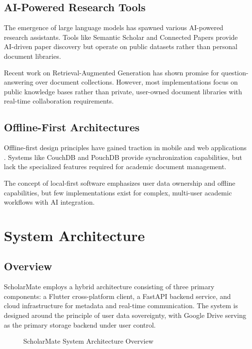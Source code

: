 \documentclass[conference]{IEEEtran}
\begin{document}
\subsection{AI-Powered Research Tools}

The emergence of large language models has spawned various AI-powered research assistants. Tools like Semantic Scholar \cite{semanticscholar} and Connected Papers \cite{connectedpapers} provide AI-driven paper discovery but operate on public datasets rather than personal document libraries.

Recent work on Retrieval-Augmented Generation \cite{rag2020} has shown promise for question-answering over document collections. However, most implementations focus on public knowledge bases rather than private, user-owned document libraries with real-time collaboration requirements.

\subsection{Offline-First Architectures}

Offline-first design principles have gained traction in mobile and web applications \cite{offlinefirst}. Systems like CouchDB \cite{couchdb} and PouchDB \cite{pouchdb} provide synchronization capabilities, but lack the specialized features required for academic document management.

The concept of local-first software \cite{localfirst} emphasizes user data ownership and offline capabilities, but few implementations exist for complex, multi-user academic workflows with AI integration.

\section{System Architecture}

\subsection{Overview}

ScholarMate employs a hybrid architecture consisting of three primary components: a Flutter cross-platform client, a FastAPI backend service, and cloud infrastructure for metadata and real-time communication. The system is designed around the principle of user data sovereignty, with Google Drive serving as the primary storage backend under user control.

\begin{figure}[htbp]
\centerline{}
\caption{ScholarMate System Architecture Overview}
\label{fig:architecture}
\end{figure}
\end{document}
